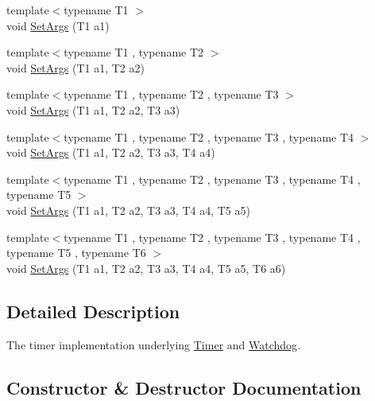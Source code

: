 \begin{DoxyCompactItemize}
\item 
{\footnotesize template$<$typename T1 $>$ }\\void \hyperlink{classns3_1_1TimerImpl_a3d0b35e91b46e054f7f237ce16b86e9a}{Set\+Args} (T1 a1)
\item 
{\footnotesize template$<$typename T1 , typename T2 $>$ }\\void \hyperlink{classns3_1_1TimerImpl_ac597446c21ae947cb4692f922c379aeb}{Set\+Args} (T1 a1, T2 a2)
\item 
{\footnotesize template$<$typename T1 , typename T2 , typename T3 $>$ }\\void \hyperlink{classns3_1_1TimerImpl_ad2286586542f41a3d66c7fc1e4995044}{Set\+Args} (T1 a1, T2 a2, T3 a3)
\item 
{\footnotesize template$<$typename T1 , typename T2 , typename T3 , typename T4 $>$ }\\void \hyperlink{classns3_1_1TimerImpl_acc94d611294e6bafa87056260dc50bf7}{Set\+Args} (T1 a1, T2 a2, T3 a3, T4 a4)
\item 
{\footnotesize template$<$typename T1 , typename T2 , typename T3 , typename T4 , typename T5 $>$ }\\void \hyperlink{classns3_1_1TimerImpl_acc3376be07cb6bafa529300bf597d9d3}{Set\+Args} (T1 a1, T2 a2, T3 a3, T4 a4, T5 a5)
\item 
{\footnotesize template$<$typename T1 , typename T2 , typename T3 , typename T4 , typename T5 , typename T6 $>$ }\\void \hyperlink{classns3_1_1TimerImpl_a2ef2e613bcdd225e6712a4f13b59b0aa}{Set\+Args} (T1 a1, T2 a2, T3 a3, T4 a4, T5 a5, T6 a6)
\end{DoxyCompactItemize}



\subsection{Detailed Description}
The timer implementation underlying \hyperlink{classns3_1_1Timer}{Timer} and \hyperlink{classns3_1_1Watchdog}{Watchdog}. 

\subsection{Constructor \& Destructor Documentation}
